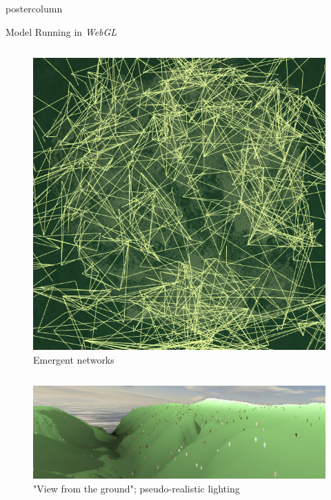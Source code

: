 \documentclass[final,hyperref={pdfpagelabels=false}]{beamer}
\begin{document}
\begin{frame}
\begin{columns}[T]
\begin{column}{.33\textwidth}
\begin{beamercolorbox}[center,wd=\textwidth]{postercolumn}
\begin{minipage}[T]{.95\textwidth}
{\begin{block}{Model Running in \textit{WebGL}}
\begin{columns}[T]
\begin{column}{.32\textwidth}
                  \begin{figure}[h!]
                  \includegraphics[width=1.0\linewidth]{images/fp16}
                  \caption{Emergent networks}
                  \end{figure}
                \end{column}         
              \end{columns}
              \begin{columns}[T]
                \begin{column}{.66\textwidth}
                  \begin{figure}[h!]
                  \includegraphics[width=1.0\linewidth]{images/fp24}
                  \caption{"View from the ground"; pseudo-realistic lighting}
                  \end{figure}
                \end{column}         
              \end{columns}

\end{block}}
\end{minipage}
\end{beamercolorbox}
\end{column}
\end{columns}
\end{frame}
\end{document}
